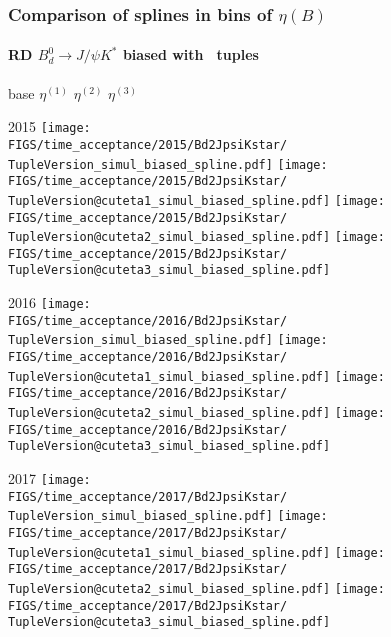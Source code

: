 \begin{frame} %
\frametitle{Comparison of splines in bins of $\eta(B)$}
\framesubtitle{RD $B_d^0\rightarrow J/\psi K^*$ biased with \TupleVersion\, tuples}

  \phantom{2020} base \hspace*{1.5cm} $\eta^{(1)}$ \hspace*{1.5cm} $\eta^{(2)}$ \hspace*{1.5cm} $\eta^{(3)}$

  2015
  \texttt{[image: \\FIGS/time\_acceptance/2015/Bd2JpsiKstar/\\TupleVersion\_simul\_biased\_spline.pdf]}
  \texttt{[image: \\FIGS/time\_acceptance/2015/Bd2JpsiKstar/\\TupleVersion@cuteta1\_simul\_biased\_spline.pdf]}
  \texttt{[image: \\FIGS/time\_acceptance/2015/Bd2JpsiKstar/\\TupleVersion@cuteta2\_simul\_biased\_spline.pdf]}
  \texttt{[image: \\FIGS/time\_acceptance/2015/Bd2JpsiKstar/\\TupleVersion@cuteta3\_simul\_biased\_spline.pdf]}
  \vspace*{2mm}

  2016
  \texttt{[image: \\FIGS/time\_acceptance/2016/Bd2JpsiKstar/\\TupleVersion\_simul\_biased\_spline.pdf]}
  \texttt{[image: \\FIGS/time\_acceptance/2016/Bd2JpsiKstar/\\TupleVersion@cuteta1\_simul\_biased\_spline.pdf]}
  \texttt{[image: \\FIGS/time\_acceptance/2016/Bd2JpsiKstar/\\TupleVersion@cuteta2\_simul\_biased\_spline.pdf]}
  \texttt{[image: \\FIGS/time\_acceptance/2016/Bd2JpsiKstar/\\TupleVersion@cuteta3\_simul\_biased\_spline.pdf]}
  \vspace*{2mm}

  2017
  \texttt{[image: \\FIGS/time\_acceptance/2017/Bd2JpsiKstar/\\TupleVersion\_simul\_biased\_spline.pdf]}
  \texttt{[image: \\FIGS/time\_acceptance/2017/Bd2JpsiKstar/\\TupleVersion@cuteta1\_simul\_biased\_spline.pdf]}
  \texttt{[image: \\FIGS/time\_acceptance/2017/Bd2JpsiKstar/\\TupleVersion@cuteta2\_simul\_biased\_spline.pdf]}
  \texttt{[image: \\FIGS/time\_acceptance/2017/Bd2JpsiKstar/\\TupleVersion@cuteta3\_simul\_biased\_spline.pdf]}
  \vspace*{2mm}


\end{frame}
